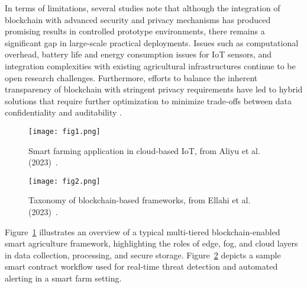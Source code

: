 \documentclass[12pt,onecolumn]{IEEEtran} %
\begin{document}
In terms of limitations, several studies note that although the integration of blockchain with advanced security and privacy mechanisms has produced promising results in controlled prototype environments, there remains a significant gap in large-scale practical deployments. Issues such as computational overhead, battery life and energy consumption issues for IoT sensors, and integration complexities with existing agricultural infrastructures continue to be open research challenges. Furthermore, efforts to balance the inherent transparency of blockchain with stringent privacy requirements have led to hybrid solutions that require further optimization to minimize trade-offs between data confidentiality and auditability \cite{soy2025blockchainintegrationin}.

\begin{figure}[htbp]
  \centering
  \texttt{[image: fig1.png]}
  \caption{Smart farming application in cloud-based IoT, from Aliyu et al. (2023)~\cite{aliyu2023blockchainbasedsmartfarm}.}
  \label{fig:fig1}
\end{figure}

\begin{figure}[htbp]
  \centering
  \texttt{[image: fig2.png]}
  \caption{Taxonomy of blockchain-based frameworks, from Ellahi et al. (2023)~\cite{ellahi2023blockchainbasedframeworksfor}.}
  \label{fig:fig2}
\end{figure}

Figure~\ref{fig:fig1} illustrates an overview of a typical multi-tiered blockchain-enabled smart agriculture framework, highlighting the roles of edge, fog, and cloud layers in data collection, processing, and secure storage.  Figure~\ref{fig:fig2} depicts a sample smart contract workflow used for real-time threat detection and automated alerting in a smart farm setting.
\end{document}
